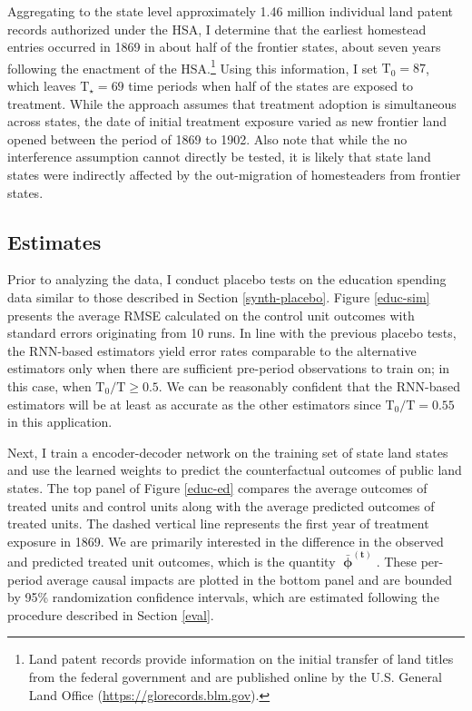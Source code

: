 Aggregating to the state level approximately 1.46 million individual land patent records authorized under the HSA, I determine that the earliest homestead entries occurred in 1869 in about half of the frontier states, about seven years following the enactment of the HSA.\footnote{Land patent records provide information on the initial transfer of land titles from the federal government and are published online by the U.S. General Land Office (\url{https://glorecords.blm.gov}).} Using this information, I set $\text{T}_0 = 87$, which leaves $\text{T}_\star = 69$ time periods when half of the states are exposed to treatment. While the approach assumes that treatment adoption is simultaneous across states, the date of initial treatment exposure varied as new frontier land opened between the period of 1869 to 1902. Also note that while the no interference assumption cannot directly be tested, it is likely that state land states were indirectly affected by the out-migration of homesteaders from frontier states. 

\subsection{Estimates}

Prior to analyzing the data, I conduct placebo tests on the education spending data similar to those described in Section \ref{synth-placebo}. Figure \ref{educ-sim} presents the average RMSE calculated on the control unit outcomes with standard errors originating from 10 runs. In line with the previous placebo tests, the RNN-based estimators yield error rates comparable to the alternative estimators only when there are sufficient pre-period observations to train on; in this case, when $\text{T}_0/\text{T} \geq 0.5$. We can be reasonably confident that the RNN-based estimators will be at least as accurate as the other estimators since $\text{T}_0/\text{T} = 0.55$ in this application. 

Next, I train a encoder-decoder network on the training set of state land states and use the learned weights to predict the counterfactual outcomes of public land states. The top panel of Figure \ref{educ-ed} compares the average outcomes of treated units and control units along with the average predicted outcomes of treated units. The dashed vertical line represents the first year of treatment exposure in 1869. We are primarily interested in the difference in the observed and predicted treated unit outcomes, which is the quantity $\boldsymbol{\bar{\upphi}^{(t)}}$. These per-period average causal impacts are plotted in the bottom panel and are bounded by 95\% randomization confidence intervals, which are estimated following the procedure described in Section \ref{eval}. 

